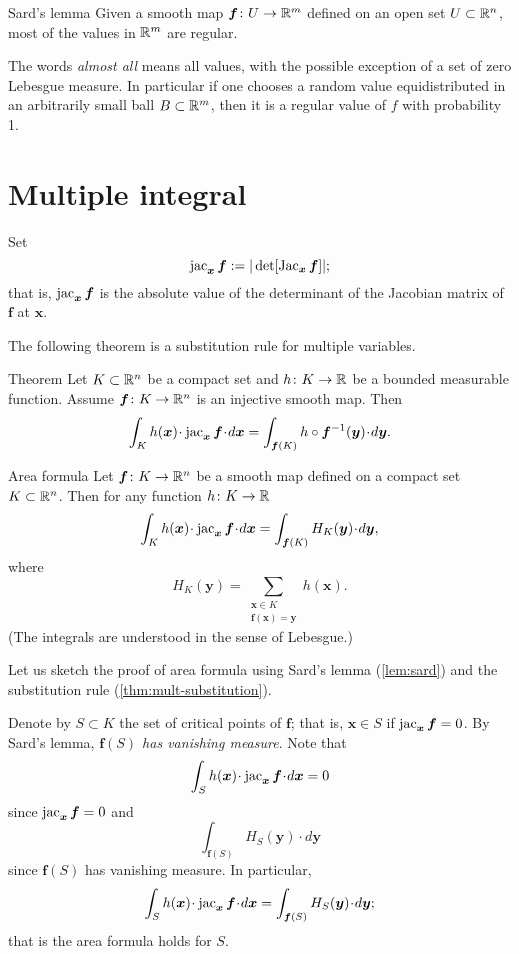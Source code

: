 \begin{thm}{Sard's lemma}\label{lem:sard}
Given a smooth map $\bm{f}\colon U \z\to \RR^m$ defined on an open set $U\subset \mathbb{R}^n$, most of the values in $\mathbb{R}^m$ are regular.
\end{thm}

The words \emph{almost all} means all values, with the possible exception of a set of zero Lebesgue measure.
In particular if one chooses a random value equidistributed in an arbitrarily small ball $B\subset \mathbb{R}^m$, then it is a regular value of $f$ with probability 1.


\section{Multiple integral}

Set 
\[\mathop{\rm jac}\nolimits_{\bm{x}}\bm{f}:=|\det[\mathop{\rm Jac}\nolimits_{\bm{x}}\bm{f}]|;\]
that is, $\mathop{\rm jac}\nolimits_{\bm{x}}\bm{f}$ is the absolute value of the determinant of the Jacobian matrix of $\bm{f}$ at $\bm{x}$.

The following theorem is a substitution rule for multiple variables.

\begin{thm}{Theorem}\label{thm:mult-substitution}
Let $K\subset \mathbb{R}^n$ be a compact set and $h\colon K\to\mathbb{R}$ be a bounded measurable function.
Assume $\bm{f}\colon K\to \mathbb{R}^n$ is an injective smooth map.
Then 
\[\int_K h(\bm{x})\cdot \jac_{\bm{x}}\bm{f}\cdot d\bm{x}
=
\int_{\bm{f}(K)} h\circ \bm{f}^{-1}(\bm{y})\cdot d\bm{y}.\]

\end{thm}


\begin{thm}{Area formula}\label{thm:area-formula}
Let $\bm{f}\colon K\to\mathbb{R}^n$ be a smooth map defined on a compact set $K\subset \mathbb{R}^n$.
Then for any function $h\colon K\to \mathbb{R}$
\[\int_K h(\bm{x})\cdot \jac_{\bm{x}}\bm{f}\cdot d\bm{x}=\int_{\bm{f}(K)} H_K(\bm{y})\cdot d\bm{y},\]
where 
\[H_K(\bm{y})=\sum_{\substack{\bm{x}\in K \\ \bm{f}(\bm{x})=\bm{y}}}h(\bm{x}).\]
(The integrals are understood in the sense of Lebesgue.)
\end{thm}

Let us sketch the proof of area formula using  Sard's lemma (\ref{lem:sard}) and the substitution rule (\ref{thm:mult-substitution}).

Denote by $S\subset K$ the set of critical points of $\bm{f}$; that is, $\bm{x}\in S$ if $\mathop{\rm jac}\nolimits_{\bm{x}}\bm{f}=0$.
By Sard's lemma,
\emph{$\bm{f}(S)$ has vanishing measure}.
Note that 
\[\int_S h(\bm{x})\cdot \jac_{\bm{x}}\bm{f}\cdot d\bm{x}=0\]
since $\mathop{\rm jac}\nolimits_{\bm{x}}\bm{f}=0$
and
\[\int_{\bm{f}(S)} H_S(\bm{y})\cdot d\bm{y}\]
since $\bm{f}(S)$ has vanishing measure.
In particular,
\[\int_S h(\bm{x})\cdot \jac_{\bm{x}}\bm{f}\cdot d\bm{x}=\int_{\bm{f}(S)} H_S(\bm{y})\cdot d\bm{y};\]
that is the area formula holds for $S$.

